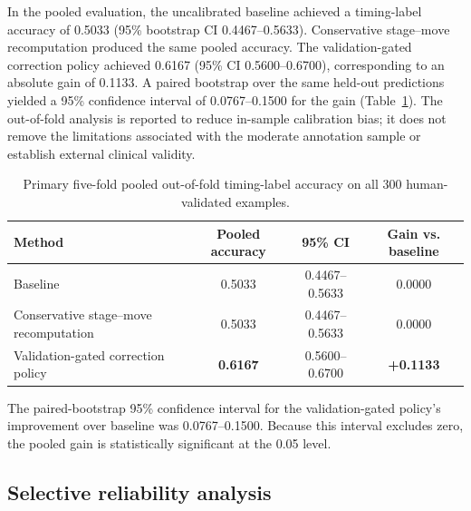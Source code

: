 \documentclass[preprint,12pt,a4paper]{elsarticle}
\newcommand{\best}[1]{\textbf{#1}}
\begin{document}
In the pooled evaluation, the uncalibrated baseline achieved a timing-label accuracy of 0.5033 (95\% bootstrap CI 0.4467--0.5633). Conservative stage--move recomputation produced the same pooled accuracy. The validation-gated correction policy achieved 0.6167 (95\% CI 0.5600--0.6700), corresponding to an absolute gain of 0.1133. A paired bootstrap over the same held-out predictions yielded a 95\% confidence interval of 0.0767--0.1500 for the gain (Table~\ref{tab:calibration}). The out-of-fold analysis is reported to reduce in-sample calibration bias; it does not remove the limitations associated with the moderate annotation sample or establish external clinical validity.

\begin{table}[!htbp]
\centering
\caption{Primary five-fold pooled out-of-fold timing-label accuracy on all 300 human-validated examples.}
\label{tab:calibration}
\small
\setlength{\tabcolsep}{5pt}
\renewcommand{\arraystretch}{1.15}
\begin{tabularx}{\linewidth}{lccc}
\toprule
\textbf{Method} &
\textbf{Pooled accuracy} &
\textbf{95\% CI} &
\textbf{Gain vs. baseline} \\
\midrule
Baseline &
0.5033 &
0.4467--0.5633 &
0.0000 \\
Conservative stage--move recomputation &
0.5033 &
0.4467--0.5633 &
0.0000 \\
Validation-gated correction policy &
\best{0.6167} &
0.5600--0.6700 &
\best{+0.1133} \\
\bottomrule
\end{tabularx}
\end{table}

The paired-bootstrap 95\% confidence interval for the validation-gated policy's improvement over baseline was 0.0767--0.1500. Because this interval excludes zero, the pooled gain is statistically significant at the 0.05 level.

\subsection{Selective reliability analysis}
\label{subsec:selective_reliability}
\end{document}
